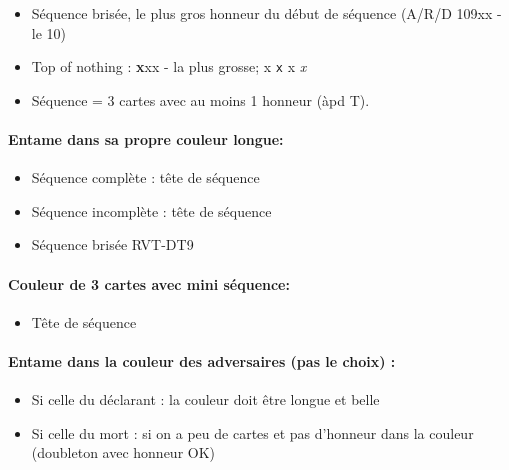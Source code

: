 \documentclass[a4paper]{article}
\begin{document}
\begin{itemize}
\item Séquence brisée, le plus gros honneur du début de séquence (A/R/D 109xx - le 10)

\end{itemize}

\begin{itemize}
\item Top of nothing : \textbf{x}xx - la plus grosse; x \texttt{x} x \emph{x}

\end{itemize}

\begin{itemize}
\item Séquence = 3 cartes avec au moins 1 honneur (àpd T).

\end{itemize}

\paragraph{Entame dans sa propre couleur longue:}

\begin{itemize}
\item Séquence complète : tête de séquence

\item Séquence incomplète : tête de séquence

\item Séquence brisée RVT-DT9

\end{itemize}

\paragraph{Couleur de 3 cartes avec mini séquence:}

\begin{itemize}
\item Tête de séquence

\end{itemize}

\paragraph{Entame dans la couleur des adversaires (pas le choix) :}

\begin{itemize}
\item Si celle du déclarant : la couleur doit être longue et belle

\item Si celle du mort : si on a peu de cartes et pas d’honneur dans la couleur (doubleton avec honneur OK)

\end{itemize}
\end{document}

